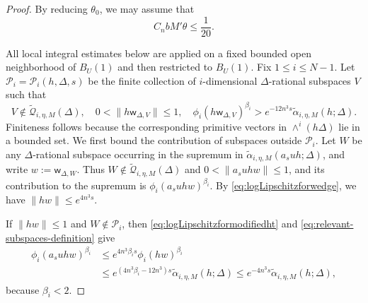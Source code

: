 \documentclass[10pt,a4paper]{amsart}
\begin{document}
\begin{proof}
By reducing $\theta_0$, we may assume that
\begin{equation}\label{eq:theta-small-global-contraction}
C_nbM'\theta\le\frac1{20}.
\end{equation}

All local integral estimates below are applied on a fixed bounded open
neighborhood of $B_{U}(1)$ and then restricted to $B_{U}(1)$.
Fix $1\le i\le N-1$. Let
$\mathcal P_i=\mathcal P_i(h,\Delta,s)$ be the finite collection
of $i$-dimensional $\Delta$-rational subspaces $V$ such that
\begin{equation}\label{eq:relevant-subspaces-definition}
V\notin\widetilde{\mathscr Q}_{i,\eta,M}(\Delta),
\quad
0<\|h\mathsf w_{\Delta,V}\|\le1,
\quad 
\phi_i(h\mathsf w_{\Delta,V})^{\beta_i}
>e^{-12n^3s}\widetilde\alpha_{i,\eta,M}(h;\Delta).
\end{equation}
Finiteness follows because the corresponding primitive vectors in
$\wedge^i(h\Delta)$ lie in a bounded set.
We first bound the contribution of subspaces outside
$\mathcal P_i$. Let $W$ be any $\Delta$-rational subspace occurring
in the supremum in
$\widetilde\alpha_{i,\eta,M}(a_suh;\Delta)$, and write $w:=\mathsf w_{\Delta,W}$. Thus $W\notin\widetilde{\mathscr Q}_{i,\eta,M}(\Delta)$ and $0<\|a_suhw\|\le1$, and its contribution to the supremum is
$\phi_i(a_suhw)^{\beta_i}$. By
\eqref{eq:logLipschitzforwedge}, we have $\|hw\|\le e^{4n^3s}$.

If
$\|hw\|\le1$ and $W\notin\mathcal P_i$, then
\eqref{eq:logLipschitzformodifiedht} and
\eqref{eq:relevant-subspaces-definition} give
\begin{equation}
\begin{aligned}
        \phi_i(a_suhw)^{\beta_i}
&\le e^{4n^3\beta_i s}\phi_i(hw)^{\beta_i}
\\&\le e^{(4n^3\beta_i-12n^3)s}
\widetilde\alpha_{i,\eta,M}(h;\Delta)
\le e^{-4n^3s}\widetilde\alpha_{i,\eta,M}(h;\Delta),
\end{aligned}
\end{equation}
because $\beta_i<2$.


\end{proof}
\end{document}
